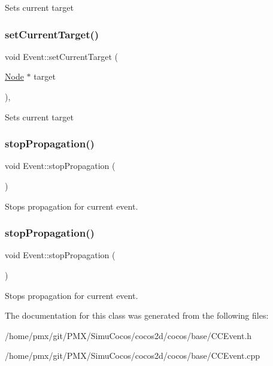 Sets current target \mbox{\label{classEvent_a60e1b57b9a97d67300a553205814ccf0}} 
\subsubsection{\texorpdfstring{set\+Current\+Target()}{setCurrentTarget()}\hspace{0.1cm}{\footnotesize\ttfamily [2/2]}}
{\footnotesize\ttfamily void Event\+::set\+Current\+Target (\begin{DoxyParamCaption}\item[{\hyperlink{classNode}{Node} $\ast$}]{target }\end{DoxyParamCaption})\hspace{0.3cm}{\ttfamily [inline]}, {\ttfamily [protected]}}

Sets current target \mbox{\label{classEvent_a69732f24bfeabbef113cf128e81ed27f}} 
\subsubsection{\texorpdfstring{stop\+Propagation()}{stopPropagation()}\hspace{0.1cm}{\footnotesize\ttfamily [1/2]}}
{\footnotesize\ttfamily void Event\+::stop\+Propagation (\begin{DoxyParamCaption}{ }\end{DoxyParamCaption})\hspace{0.3cm}{\ttfamily [inline]}}

Stops propagation for current event. \mbox{\label{classEvent_a69732f24bfeabbef113cf128e81ed27f}} 
\subsubsection{\texorpdfstring{stop\+Propagation()}{stopPropagation()}\hspace{0.1cm}{\footnotesize\ttfamily [2/2]}}
{\footnotesize\ttfamily void Event\+::stop\+Propagation (\begin{DoxyParamCaption}{ }\end{DoxyParamCaption})\hspace{0.3cm}{\ttfamily [inline]}}

Stops propagation for current event. 

The documentation for this class was generated from the following files\+:\begin{DoxyCompactItemize}
\item 
/home/pmx/git/\+P\+M\+X/\+Simu\+Cocos/cocos2d/cocos/base/C\+C\+Event.\+h\item 
/home/pmx/git/\+P\+M\+X/\+Simu\+Cocos/cocos2d/cocos/base/C\+C\+Event.\+cpp\end{DoxyCompactItemize}
